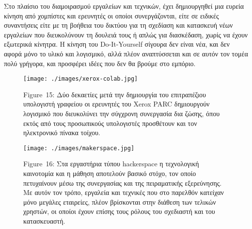 \documentclass[
]{article}
\begin{document}
Στο πλαίσιο του διαμοιρασμού εργαλείων και τεχνικών, έχει δημιουργηθεί
μια ευρεία κίνηση από χομπίστες και ερευνητές οι οποίοι συνεργάζονται,
είτε σε ειδικές συναντήσεις είτε με τη βοήθεια του δικτύου για τη
σχεδίαση και κατασκευή νέων εργαλείων που διευκολύνουν τη δουλειά τους ή
απλώς για διασκέδαση, χωρίς να έχουν εξωτερικά κίνητρα. Η κίνηση του
Do-It-Yourself σίγουρα δεν είναι νέα, και δεν αφορά μόνο το υλικό και
λογισμικό, αλλά πλέον αναπτύσσεται και σε αυτόν τον τομέα πολύ γρήγορα,
και προσφέρει ιδέες που δεν θα βρούμε στο εμπόριο.

\leavevmode{}%
\begin{figure}
\hypertarget{fig:xerox-colab}{%
\centering
\texttt{[image: ./images/xerox-colab.jpg]}
\caption{Figure~15: Δύο δεκαετίες μετά την δημιουργία του επιτραπέζιου
υπολογιστή γραφείου οι ερευνητές του Xerox PARC δημιουργούν λογισμικό
που διευκολύνει την σύγχρονη συνεργασία δια ζώσης, όπου εκτός από τους
προσωπικούς υπολογιστές προσθέτουν και τον ηλεκτρονικό πίνακα
τοίχου.}\label{fig:xerox-colab}
}
\end{figure}

\leavevmode{}%
\begin{figure}
\hypertarget{fig:makerspace}{%
\centering
\texttt{[image: ./images/makerspace.jpg]}
\caption{Figure~16: Στα εργαστήρια τύπου hackerspace η τεχνολογική
καινοτομία και η μάθηση αποτελούν βασικό στόχο, τον οποίο πετυχαίνουν
μέσω της συνεργασίας και της πειραματικής εξερεύνησης. Με αυτόν τον
τρόπο, εργαλεία και τεχνικές που στο παρελθόν κατείχαν μόνο μεγάλες
εταιρείες, πλέον βρίσκονται στην διάθεση των τελικών χρηστών, οι οποίοι
έχουν επίσης τους ρόλους του σχεδιαστή και του
κατασκευαστή.}\label{fig:makerspace}
}
\end{figure}
\end{document}
